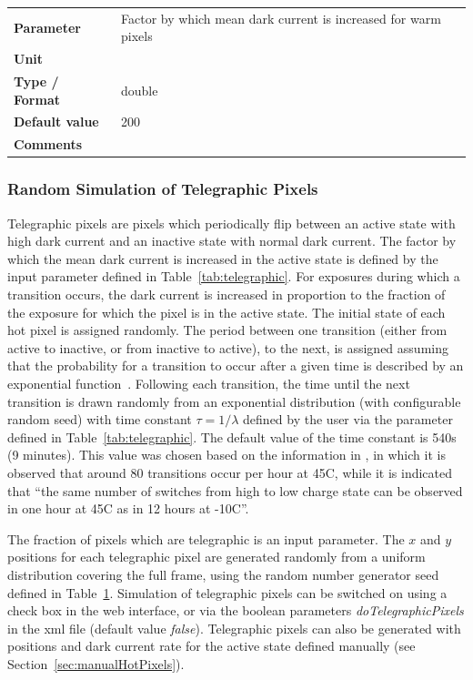 \documentclass[11pt]{article}      %
\def\HCode#1{}
\def\htmlanchor#1{\HCode{<a id="#1"></a>}}
\begin{document}
\begin{table}[hb]
  \htmlanchor{warmPixelRelativeDarkCurrent}
  \begin{tabular}{| l | p{13cm} |}
    \hline 
    {\bf Parameter} & Factor by which mean dark current is increased for warm pixels\\
    {\bf Unit} & \\
    {\bf Type / Format} & double\\
    {\bf Default value} & 200\\
    {\bf Comments} &\\
    \hline
  \end{tabular}
  \bigskip

  \label{tab:hotPixels}
\end{table}

\htmlanchor{telegraphicPixels}
\subsubsection{Random Simulation of Telegraphic Pixels}
\label{sec:telegraphicPixels}

Telegraphic pixels are pixels which periodically flip between an active state with high dark current and an inactive state with normal dark current. The factor by which the mean dark current is increased in the active state is defined by the input parameter defined in Table~\ref{tab:telegraphic}. For exposures during which a transition occurs, the dark current is increased in proportion to the fraction of the exposure for which the pixel is in the active state. The initial state of each hot pixel is assigned randomly. The period between one transition (either from active to inactive, or from inactive to active), to the next, is assigned assuming that the probability for a transition to occur after a given time is described by an exponential function~\cite{telegraphic}. Following each transition, the time until the next transition is drawn randomly from an exponential distribution (with configurable random seed) with time constant $\tau=1/\lambda$ defined by the user via the parameter defined in Table~\ref{tab:telegraphic}. The default value of the time constant is 540s (9 minutes). This value was chosen based on the information in \cite{telegraphic}, in which it is observed that around 80 transitions occur per hour at 45\textdegree C, while it is indicated that ``the same number of switches from high to low charge state can be observed in one hour at 45\textdegree C as in 12 hours at -10\textdegree C''.

The fraction of pixels which are telegraphic is an input parameter. The $x$ and $y$ positions for each telegraphic pixel are generated randomly from a uniform distribution covering the full frame, using the random number generator seed defined in Table~\ref{tab:hotPixels}. Simulation of telegraphic pixels can be switched on using a check box in the web interface, or via the boolean parameters {\it doTelegraphicPixels} in the xml file (default value {\it false}). Telegraphic pixels can also be generated with positions and dark current rate for the active state defined manually (see Section~\ref{sec:manualHotPixels}).
\end{document}
